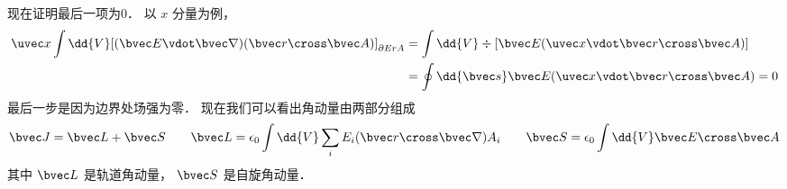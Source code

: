 现在证明最后一项为0． 以 $x$ 分量为例，
\begin{equation}
\begin{aligned}
\uvec x \int \dd{V} [(\bvec E \vdot \bvec\nabla )(\bvec r \cross \bvec A)]_{\partial ErA}  &= \int \dd{V} \div [\bvec E(\uvec x \vdot \bvec r \cross \bvec A) ] \\
&= \oint \dd{\bvec s} \bvec E(\uvec x \vdot \bvec r \cross \bvec A)  = 0
\end{aligned}
\end{equation}
最后一步是因为边界处场强为零． 现在我们可以看出角动量由两部分组成
\begin{equation}
\bvec J = \bvec L + \bvec S \qquad
\bvec L = \epsilon_0 \int \dd{V} \sum_i E_i (\bvec r \cross \bvec\nabla ) A_i \qquad
\bvec S = \epsilon_0 \int \dd{V} \bvec E \cross \bvec A
\end{equation}
其中 $\bvec L$ 是轨道角动量， $\bvec S$ 是自旋角动量．
